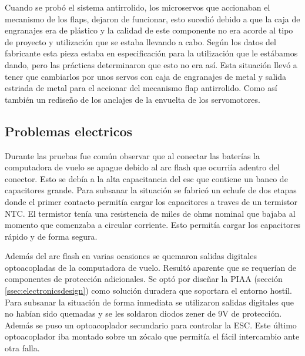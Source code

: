 \medskip

Cuando se probó el sistema antirrolido, los microservos que accionaban el mecanismo de los flaps, dejaron de funcionar, esto sucedió debido a que la caja de engranajes era de plástico y la calidad de este componente no era acorde al tipo de proyecto y utilización que se estaba llevando a cabo. Según los datos del fabricante esta pieza estaba en especificación para la utilización que le estábamos dando, pero las prácticas determinaron que esto no era así. Esta situación llevó a tener que cambiarlos por unos servos con caja de engranajes de metal y salida estriada de metal para el accionar del mecanismo flap antirrolido. Como así también un rediseño de los anclajes de la envuelta de los servomotores.

\subsection{Problemas electricos}
Durante las pruebas fue común observar que al conectar las baterías la computadora de vuelo se apague debido al arc flash que ocurriía adentro del conector. Esto se debía a la alta capacitancia
del \gls{esc} que contiene un banco de capacitores grande. Para subsanar la situación se fabricó un echufe de dos etapas donde el primer contacto permitía cargar los capacitores a traves de un termistor NTC. El termistor tenía una resistencia de miles de ohms nominal que bajaba al momento que comenzaba a circular corriente. Esto permitía cargar los capacitores rápido y de forma segura.

Además del arc flash en varias ocasiones se quemaron salidas digitales optoacopladas de la computadora de vuelo. Resultó aparente que se requerían de componentes de protección adicionales.
Se optó por diseñar la PIAA (sección \ref{ssec:electronicsdesign}) como solución duradera que soportara el entorno hostíl. Para subsanar la situación de forma inmediata se utilizaron salidas digitales que no habían sido quemadas y se les soldaron diodos zener de 9V de protección. Además se puso un optoacoplador secundario para controlar la ESC. Este último optoacoplador iba montado sobre un zócalo que permitía el fácil intercambio ante otra falla.